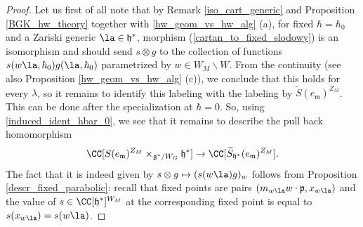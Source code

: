 \documentclass[12pt]{amsart}
\begin{document}
\begin{proof}
Let us first of all note that by Remark \ref{iso_cart_generic} and Proposition \ref{BGK_hw_theory} together with \cref{hw_geom_vs_hw_alg} (a), for fixed $\hbar=\hbar_0$ and a Zariski generic $\la \in \mathfrak{h}^*$, morphism (\ref{cartan_to_fixed_slodowy}) is an isomorphism and should send $s \otimes g$ to the collection of functions $s(w\la,\hbar_0)g(\la,\hbar_0)$ parametrized by  $w \in W_M \backslash W$. From the continuity (see also Proposition \ref{hw_geom_vs_hw_alg} (c)), we conclude that this holds for every $\lambda$, so it remains to identify this labeling with the labeling by $\widetilde{S}(e_{\mathfrak{m}})^{Z_M}$.
This can be done after the specialization at $\hbar=0$. So, using \cref{induced_ident_hbar_0}, we see that it remains to describe the pull back homomorphism
\begin{equation*}
\CC[S(e_{\mathfrak{m}})^{Z_M} \times_{\mathfrak{g}^*/W_G} \mathfrak{h}^*] \rightarrow \CC[\widetilde{S}_{\mathfrak{h}^*}(e_{\mathfrak{m}})^{Z_M}].
\end{equation*}
The fact that it is indeed given by $s \otimes g \mapsto (s(w\la)g)_{w}$  follows from Proposition \ref{descr_fixed_parabolic}: recall that fixed points are pairs $(m_{w\la}w \cdot \mathfrak{p},x_{w\la})$ and the value of $s \in \CC[\mathfrak{h}^*]^{W_M}$ at the corresponding fixed point is equal to $s(x_{w\la})=s(w\la)$. 
\end{proof}
\end{document}
